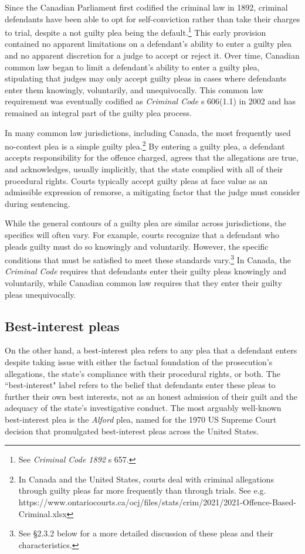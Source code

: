 Since the Canadian Parliament first codified the criminal law in 1892, criminal defendants have been able to opt for self-conviction rather than take their charges to trial, despite a not guilty plea being the default.\footnote{See \textit{Criminal Code 1892} s 657.} This early provision contained no apparent limitations on a defendant's ability to enter a guilty plea and no apparent discretion for a judge to accept or reject it. Over time, Canadian common law began to limit a defendant's ability to enter a guilty plea, stipulating that judges may only accept guilty pleas in cases where defendants enter them knowingly, voluntarily, and unequivocally. This common law requirement was eventually codified as \textit{Criminal Code} s 606(1.1) in 2002 and has remained an integral part of the guilty plea process.

In many common law jurisdictions, including Canada, the most frequently used no-contest plea is a simple guilty plea.\footnote{In Canada and the United States, courts deal with criminal allegations through guilty pleas far more frequently than through trials. See e.g. https://www.ontariocourts.ca/ocj/files/stats/crim/2021/2021-Offence-Based-Criminal.xlsx} By entering a guilty plea, a defendant accepts responsibility for the offence charged, agrees that the allegations are true, and acknowledges, usually implicitly, that the state complied with all of their procedural rights. Courts typically accept guilty pleas at face value as an admissible expression of remorse, a mitigating factor that the judge must consider during sentencing.

While the general contours of a guilty plea are similar across jurisdictions, the specifics will often vary. For example, courts recognize that a defendant who pleads guilty must do so knowingly and voluntarily. However, the specific conditions that must be satisfied to meet these standards vary.\footnote{See §2.3.2 below for a more detailed discussion of these pleas and their characteristics.} In Canada, the \textit{Criminal Code} requires that defendants enter their guilty pleas knowingly and voluntarily, while Canadian common law requires that they enter their guilty pleas unequivocally.

\subsection{Best-interest pleas}

On the other hand, a best-interest plea refers to any plea that a defendant enters despite taking issue with either the factual foundation of the prosecution's allegations, the state's compliance with their procedural rights, or both. The ``best-interest" label refers to the belief that defendants enter these pleas to further their own best interests, not as an honest admission of their guilt and the adequacy of the state's investigative conduct. The most arguably well-known best-interest plea is the \textit{Alford} plea, named for the 1970 US Supreme Court decision that promulgated best-interest pleas across the United States.

